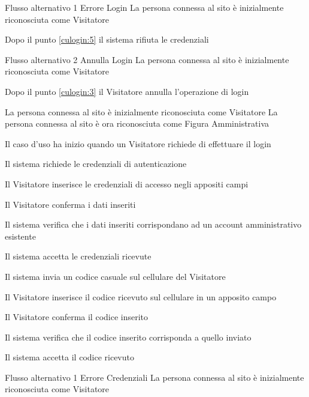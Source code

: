%
{Flusso alternativo 1}%
{Errore Login}%
{La persona connessa al sito è inizialmente riconosciuta come Visitatore}%
{\postNulle}%
{\begin{enumCU}
	\item Dopo il punto \ref{culogin:5} il sistema rifiuta le credenziali
\end{enumCU}}%
%
{Flusso alternativo 2}%
{Annulla Login}%
{La persona connessa al sito è inizialmente riconosciuta come Visitatore}%
{\postNulle}%
{\begin{enumCU}
		\item Dopo il punto \ref{culogin:3} il Visitatore annulla l'operazione di login
\end{enumCU}}%


%
{}%
{La persona connessa al sito è inizialmente riconosciuta come Visitatore}%
{La persona connessa al sito è ora riconosciuta come Figura Amministrativa}%
{\begin{enumCU}
	\item Il caso d'uso ha inizio quando un Visitatore richiede di effettuare il login 
	\item Il sistema richiede le credenziali di autenticazione
	\item Il Visitatore inserisce le credenziali di accesso negli appositi campi \label{culoginamm:3}
	\item Il Visitatore conferma i dati inseriti
	\item Il sistema verifica che i dati inseriti corrispondano ad un account amministrativo esistente\label{culoginamm:5}
	\item Il sistema accetta le credenziali ricevute
	\item Il sistema invia un codice casuale sul cellulare del Visitatore
	\item Il Visitatore inserisce il codice ricevuto sul cellulare in un apposito campo \label{culoginamm:8}
	\item Il Visitatore conferma il codice inserito
	\item Il sistema verifica che il codice inserito corrisponda a quello inviato \label{culoginamm:10}
	\item Il sistema accetta il codice ricevuto
\end{enumCU}}%
%
{Flusso alternativo 1}%
{Errore Credenziali}%
{La persona connessa al sito è inizialmente riconosciuta come Visitatore}%
